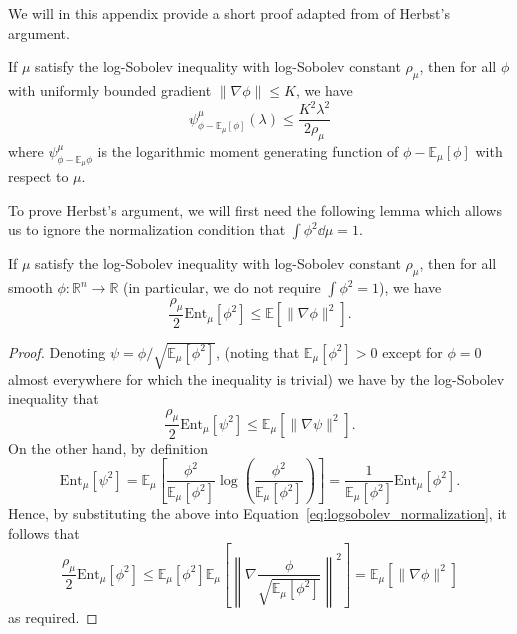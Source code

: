 We will in this appendix provide a short proof adapted from \cite{Herbst} of Herbst's argument.
\begin{theorem}  
  If \(\mu\) satisfy the log-Sobolev inequality with log-Sobolev constant \(\rho_\mu\), then for all \(\phi\) with 
  uniformly bounded gradient \(\|\nabla \phi\| \le K\), we have 
  \[\psi_{\phi - \mathbb{E}_\mu[\phi]}^\mu(\lambda) \le \frac{K^2 \lambda^2}{2\rho_\mu}\]
  where \(\psi_{\phi - \mathbb{E}_\mu \phi}^\mu\) is the logarithmic moment generating function of 
  \(\phi - \mathbb{E}_\mu[\phi]\) with respect to \(\mu\).
\end{theorem}

To prove Herbst's argument, we will first need the following lemma which allows us to ignore the 
normalization condition that \(\int\phi^2 \dd\mu = 1\).

\begin{lemma}
  If \(\mu\) satisfy the log-Sobolev inequality with log-Sobolev constant \(\rho_\mu\), then for all 
  smooth \(\phi : \mathbb{R}^n \to \mathbb{R}\) (in particular, we do not require \(\int\phi^2 = 1\)),
  we have 
  \[\frac{\rho_\mu}{2}\text{Ent}_\mu[\phi^2] \le \mathbb{E}[\|\nabla \phi\|^2].\] 
\end{lemma}
\begin{proof}
  Denoting \(\psi = \phi / \sqrt{\mathbb{E}_\mu[\phi^2]}\), (noting that \(\mathbb{E}_\mu[\phi^2] > 0\) except for \(\phi = 0\) almost everywhere for 
  which the inequality is trivial) we have by the log-Sobolev inequality that 
  \begin{equation}\label{eq:logsobolev_normalization}
    \frac{\rho_\mu}{2}\text{Ent}_\mu[\psi^2] \le \mathbb{E}_\mu[\|\nabla \psi\|^2].
  \end{equation}
  On the other hand, by definition
  \[\text{Ent}_\mu[\psi^2] = \mathbb{E}_\mu\left[\frac{\phi^2}{\mathbb{E}_\mu[\phi^2]}\log\left(\frac{\phi^2}{\mathbb{E}_\mu[\phi^2]}\right)\right]
    = \frac{1}{\mathbb{E}_\mu[\phi^2]}\text{Ent}_\mu[\phi^2].\]
  Hence, by substituting the above into Equation~\ref{eq:logsobolev_normalization}, it follows that
  \[\frac{\rho_\mu}{2}\text{Ent}_\mu[\phi^2] 
    \le \mathbb{E}_\mu[\phi^2]\mathbb{E}_\mu\left[\left\|\nabla \frac{\phi}{\sqrt{\mathbb{E}_\mu[\phi^2]}}\right\|^2\right]
    = \mathbb{E}_\mu[\|\nabla \phi\|^2]\]
  as required.
\end{proof}

